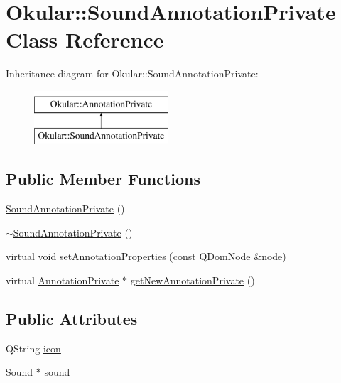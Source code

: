 \hypertarget{classOkular_1_1SoundAnnotationPrivate}{\section{Okular\+:\+:Sound\+Annotation\+Private Class Reference}
\label{classOkular_1_1SoundAnnotationPrivate}
}
Inheritance diagram for Okular\+:\+:Sound\+Annotation\+Private\+:\begin{figure}[H]
\begin{center}
\leavevmode
\includegraphics[height=2.000000cm]{classOkular_1_1SoundAnnotationPrivate}
\end{center}
\end{figure}
\subsection*{Public Member Functions}
\begin{DoxyCompactItemize}
\item 
\hyperlink{classOkular_1_1SoundAnnotationPrivate_a0c056725f9237bec33cd987b472a3597}{Sound\+Annotation\+Private} ()
\item 
\hyperlink{classOkular_1_1SoundAnnotationPrivate_adb12fec8076ffbdb0069539bd68d5fa9}{$\sim$\+Sound\+Annotation\+Private} ()
\item 
virtual void \hyperlink{classOkular_1_1SoundAnnotationPrivate_ae808c4f7990be3e0f55e27ec3ea00ec8}{set\+Annotation\+Properties} (const Q\+Dom\+Node \&node)
\item 
virtual \hyperlink{classOkular_1_1AnnotationPrivate}{Annotation\+Private} $\ast$ \hyperlink{classOkular_1_1SoundAnnotationPrivate_ad34db84fe91420930600880b2f640ee6}{get\+New\+Annotation\+Private} ()
\end{DoxyCompactItemize}
\subsection*{Public Attributes}
\begin{DoxyCompactItemize}
\item 
Q\+String \hyperlink{classOkular_1_1SoundAnnotationPrivate_abb28ae969447ed83b167d0436739e07a}{icon}
\item 
\hyperlink{classOkular_1_1Sound}{Sound} $\ast$ \hyperlink{classOkular_1_1SoundAnnotationPrivate_ad2d545e1fae26bc98d931ebb4c21079a}{sound}
\end{DoxyCompactItemize}



